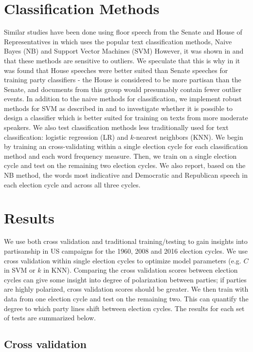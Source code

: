 \documentclass[aps, prl, reprint, showpacs]{revtex4-1}
\begin{document}
\section{Classification Methods}
Similar studies have been done using floor speech from the Senate and House of Representatives in \cite{yu} which uses the popular text classification methods, Naive Bayes (NB) and Support Vector Machines (SVM) However, it was shown in \cite{kwon} and \cite{thomas} that these methods are sensitive to outliers. We speculate that this is why in \cite{yu} it was found that House speeches were better suited than Senate speeches for training party classifiers - the House is considered to be more partisan than the Senate, and documents from this group would presumably contain fewer outlier events. In addition to the naive methods for classification, we implement robust methods for SVM  as described in \cite{chandra} and \cite{xu} to investigate whether it is possible to design a classifier which is better suited for training on texts from more moderate speakers. We also test classification methods less traditionally used for text classification: logistic regression (LR) and $k$-nearest neighbors (KNN). We begin by training an cross-validating within a single election cycle for each classification method and each word frequency measure.  Then, we train on a single election cycle and test on the remaining two election cycles. We also report, based on the NB method, the words most indicative and Democratic and Republican speech in each election cycle and across all three cycles.

\section{Results}

We use both cross validation and traditional training/testing to gain insights into partisanship in US campaigns for the 1960, 2008 and 2016 election cycles. We use cross validation within single election cycles to optimize model parameters (e.g. $C$ in SVM or $k$ in KNN). Comparing the cross validation scores between election cycles can give some insight into degree of polarization between parties; if parties are highly polarized, cross validation scores should be greater. We then train with data from one election cycle and test on the remaining two. This can quantify the degree to which party lines shift between election cycles. The results for each set of tests are summarized below.

\subsection{Cross validation}
\end{document}
